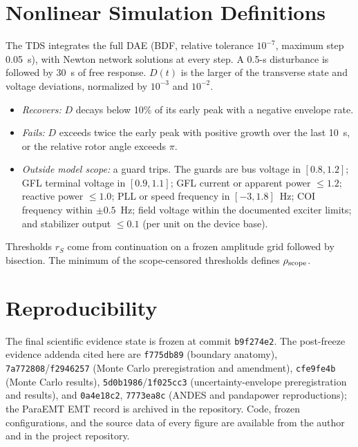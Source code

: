 \documentclass[journal]{IEEEtran}
\theoremstyle{definition}
\theoremstyle{remark}
\begin{document}
\section{Nonlinear Simulation Definitions}\label{app:tds}
The TDS integrates the full DAE (BDF, relative tolerance $10^{-7}$, maximum
step 0.05~s), with Newton network solutions at every step. A 0.5-s disturbance
is followed by 30~s of free response. $D(t)$ is the larger of the transverse
state and voltage deviations, normalized by $10^{-3}$ and $10^{-2}$.
\begin{itemize}
\item \emph{Recovers:} $D$ decays below 10\% of its early peak with a negative
envelope rate.
\item \emph{Fails:} $D$ exceeds twice the early peak with positive growth over
the last 10~s, or the relative rotor angle exceeds $\pi$.
\item \emph{Outside model scope:} a guard trips. The guards are bus voltage in
$[0.8,1.2]$; GFL terminal voltage in $[0.9,1.1]$; GFL current or apparent power
$\le1.2$; reactive power $\le1.0$; PLL or speed frequency in $[-3,1.8]$~Hz; COI
frequency within $\pm0.5$~Hz; field voltage within the documented exciter
limits; and stabilizer output $\le0.1$ (per unit on the device base).
\end{itemize}
Thresholds $r_S$ come from continuation on a frozen amplitude grid followed by
bisection. The minimum of the scope-censored thresholds defines
$\rho_{\rm scope}$.

\section*{Reproducibility}
The final scientific evidence state is frozen at commit \texttt{b9f274e2}.
The post-freeze evidence addenda cited here are \texttt{f775db89} (boundary
anatomy), \texttt{7a772808}/\texttt{f2946257} (Monte Carlo preregistration and
amendment), \texttt{cfe9fe4b} (Monte Carlo results), \texttt{5d0b1986}/\texttt{1f025cc3}
(uncertainty-envelope preregistration and results), and \texttt{0a4e18c2},
\texttt{7773ea8c} (ANDES and pandapower reproductions); the ParaEMT EMT record
is archived in the repository. Code, frozen
configurations, and the source data of every figure are available from the
author and in the project repository.

\balance


\end{document}
